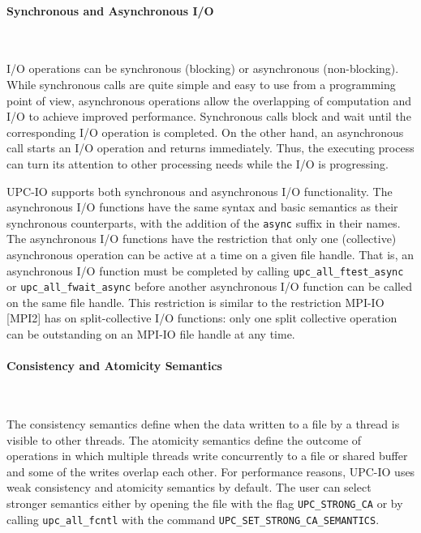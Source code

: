 \documentclass[12pt,titlepage]{article}
\newcounter{parnum}
\newcommand{\tab}{\textt{~~~~~~}}
\newcommand{\np}{
  \addtocounter{parnum}{1}
  \latex{\hspace{-2em}\makebox[2em][l]{\arabic{parnum}}}
  \html{{\bf {\arabic{parnum}}}\tab}}
\newcommand{\npf}{\setcounter{parnum}{0}\np}
\begin{document}
\paragraph{Synchronous and Asynchronous I/O}\ \\

\npf I/O operations can be synchronous (blocking) or asynchronous (non-blocking).
While synchronous calls are quite simple and easy to use from a programming
point of view, asynchronous operations allow the overlapping of computation
and I/O to achieve improved performance. Synchronous calls block and wait
until the corresponding I/O operation is completed. On the other hand, an
asynchronous call starts an I/O operation and returns immediately. Thus, the
executing process can turn its attention to other processing needs while the
I/O is progressing.

\np UPC-IO supports both synchronous and asynchronous I/O functionality. The
asynchronous I/O functions have the same syntax and basic semantics as their synchronous
counterparts, with the addition of the {\tt async} suffix in their names. The
asynchronous I/O functions have the restriction that only one (collective)
asynchronous operation can be active at a time on a given file handle. That
is, an asynchronous I/O function must be completed by calling
{\tt upc\_all\_ftest\_async} or {\tt upc\_all\_fwait\_async} before another asynchronous
I/O function can be called on the same file handle. This restriction is
similar to the restriction MPI-IO [MPI2] has on split-collective I/O functions:
only one split collective operation can be outstanding on an MPI-IO file
handle at any time.

\paragraph{Consistency and Atomicity Semantics}\ \\

\npf The consistency semantics define when the data written
to a file by a thread is visible to other threads. The atomicity semantics
define the outcome of operations in which multiple threads write
concurrently to a file or shared buffer and some of the writes overlap each other. For
performance reasons, UPC-IO uses weak consistency and
atomicity semantics by default. The user can select stronger semantics either by
opening the file with the flag {\tt UPC\_STRONG\_CA} or by calling 
{\tt upc\_all\_fcntl} with the command 
{\tt UPC\_SET\_STRONG\_CA\_SEMANTICS}.
\end{document}
